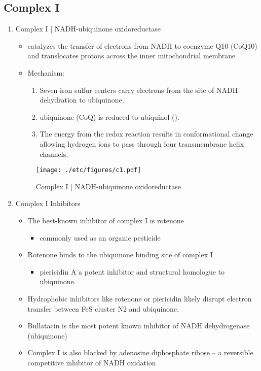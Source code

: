 \documentclass{scrartcl}
\begin{document}
\subsection{Complex I}
\label{sec:orged92e21}
\begin{enumerate}
\item Complex I | NADH-ubiquinone oxidoreductase
\label{sec:orgb269f7c}
\begin{itemize}
\item catalyzes the transfer of electrons from NADH to coenzyme Q10
(CoQ10) and translocates protons across the inner mitochondrial
membrane
\end{itemize}

{\small{}}

\begin{itemize}
\item Mechanism: 
\begin{enumerate}
\item Seven iron sulfur centers carry electrons from the site of NADH
dehydration to ubiquinone.

\item ubiquinone (CoQ) is reduced to ubiquinol ().

\item The energy from the redox reaction results in conformational
change allowing hydrogen ions to pass through four transmembrane
helix channels.
\end{enumerate}
\end{itemize}

\begin{figure}[htbp]
\centering
\texttt{[image: ./etc/figures/c1.pdf]}
\caption[c1]{\label{fig:orgb60ec17}
Complex I | NADH-ubiquinone oxidoreductase}
\end{figure}

\item Complex I Inhibitors
\label{sec:orgd39f91b}
\begin{itemize}
\item The best-known inhibitor of complex I is rotenone
\begin{itemize}
\item commonly used as an organic pesticide
\end{itemize}
\item Rotenone binds to the ubiquinone binding site of complex I
\begin{itemize}
\item piericidin A a potent inhibitor and structural homologue to ubiquinone.
\end{itemize}
\item Hydrophobic inhibitors like rotenone or piericidin likely disrupt electron transfer between FeS cluster N2 and ubiquinone.
\item Bullatacin is the most potent known inhibitor of NADH dehydrogenase (ubiquinone)
\item Complex I is also blocked by adenosine diphosphate ribose – a reversible competitive inhibitor of NADH oxidation
\end{itemize}
\end{enumerate}
\end{document}
